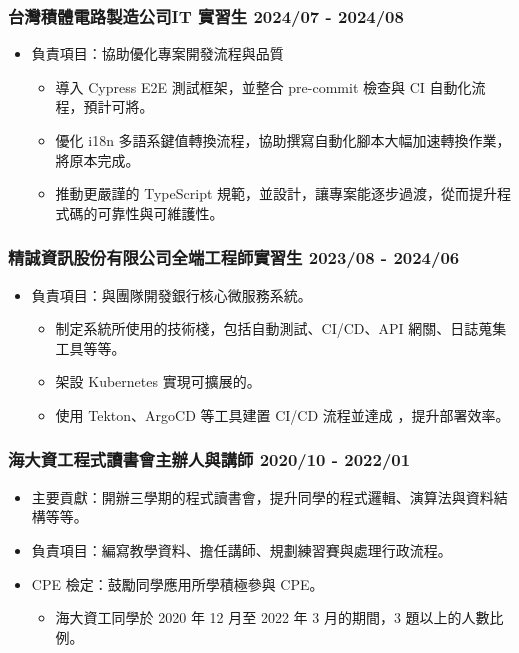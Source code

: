 \subsubsection*{台灣積體電路製造公司\quad IT 實習生 \hfill 2024/07 - 2024/08}

\begin{itemize}
    \item 負責項目：協助優化專案開發流程與品質
    \begin{itemize}
        \item 導入 Cypress E2E 測試框架，並整合 pre-commit 檢查與 CI 自動化流程，預計可將。
        \item 優化 i18n 多語系鍵值轉換流程，協助撰寫自動化腳本大幅加速轉換作業，將原本完成。
        \item 推動更嚴謹的 TypeScript 規範，並設計，讓專案能逐步過渡，從而提升程式碼的可靠性與可維護性。
    \end{itemize}
\end{itemize}

\subsubsection*{精誠資訊股份有限公司\quad 全端工程師實習生 \hfill 2023/08 - 2024/06}

\begin{itemize}
    \item 負責項目：與團隊開發銀行核心微服務系統。
    \begin{itemize}
        \item 制定系統所使用的技術棧，包括自動測試、CI/CD、API 網關、日誌蒐集工具等等。
        \item 架設 Kubernetes 實現可擴展的。
        \item 使用 Tekton、ArgoCD 等工具建置 CI/CD 流程並達成 ，提升部署效率。
    \end{itemize}
\end{itemize}

\subsubsection*{海大資工程式讀書會\quad 主辦人與講師 \hfill 2020/10 - 2022/01}

\begin{itemize}
    \item 主要貢獻：開辦三學期的程式讀書會，提升同學的程式邏輯、演算法與資料結構等等。
    \item 負責項目：編寫教學資料、擔任講師、規劃練習賽與處理行政流程。
    \item CPE 檢定：鼓勵同學應用所學積極參與 CPE。
    \begin{itemize}
        \item 海大資工同學於 2020 年 12 月至 2022 年 3 月的期間，3 題以上的人數比例。
    \end{itemize}
\end{itemize}

